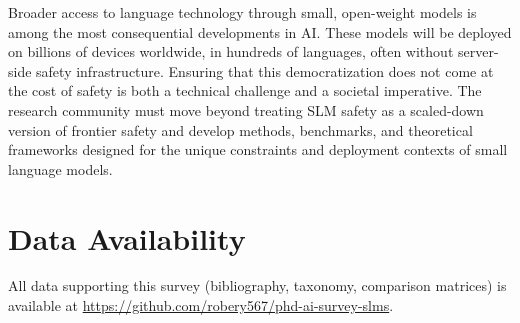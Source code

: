 \documentclass[12pt,a4paper]{article}
\begin{document}
Broader access to language technology through small, open-weight models is among the most consequential developments in AI. These models will be deployed on billions of devices worldwide, in hundreds of languages, often without server-side safety infrastructure. Ensuring that this democratization does not come at the cost of safety is both a technical challenge and a societal imperative. The research community must move beyond treating SLM safety as a scaled-down version of frontier safety and develop methods, benchmarks, and theoretical frameworks designed for the unique constraints and deployment contexts of small language models.

\section*{Data Availability}
All data supporting this survey (bibliography, taxonomy, comparison matrices) is available at \url{https://github.com/robery567/phd-ai-survey-slms}.


\end{document}
